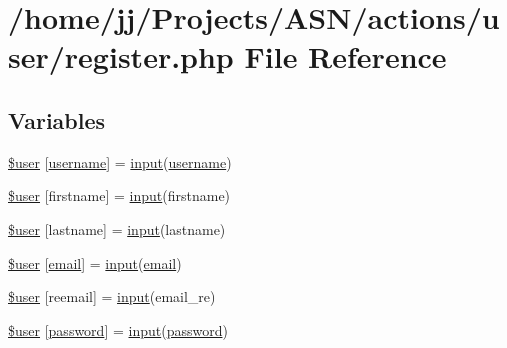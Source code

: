 \hypertarget{register_8php}{}\section{/home/jj/\+Projects/\+A\+S\+N/actions/user/register.php File Reference}
\label{register_8php}
\subsection*{Variables}
\begin{DoxyCompactItemize}
\item 
\hyperlink{register_8php_a48c184d1487bdbc0b0d2fe6e1521dd7d}{\$user} \mbox{[}\textquotesingle{}\hyperlink{actions_2account_8php_ac9b3768ccc688c2ff0811c50c107a02e}{username}\textquotesingle{}\mbox{]} = \hyperlink{ossn_8lib_8input_8php_a64ebee98b041c4f75f71ed3cd73cc8ed}{input}(\textquotesingle{}\hyperlink{actions_2account_8php_ac9b3768ccc688c2ff0811c50c107a02e}{username}\textquotesingle{})
\item 
\hyperlink{register_8php_a3c8ba9ea696968574370c51a90ff638c}{\$user} \mbox{[}\textquotesingle{}firstname\textquotesingle{}\mbox{]} = \hyperlink{ossn_8lib_8input_8php_a64ebee98b041c4f75f71ed3cd73cc8ed}{input}(\textquotesingle{}firstname\textquotesingle{})
\item 
\hyperlink{register_8php_a1187774c6d9942181216e0839e5e73bc}{\$user} \mbox{[}\textquotesingle{}lastname\textquotesingle{}\mbox{]} = \hyperlink{ossn_8lib_8input_8php_a64ebee98b041c4f75f71ed3cd73cc8ed}{input}(\textquotesingle{}lastname\textquotesingle{})
\item 
\hyperlink{register_8php_ae9de5cc5ae3fec81bb110d3a77ad7eec}{\$user} \mbox{[}\textquotesingle{}\hyperlink{actions_2account_8php_a011c66ae212438e0d7de7c0e40451bb3}{email}\textquotesingle{}\mbox{]} = \hyperlink{ossn_8lib_8input_8php_a64ebee98b041c4f75f71ed3cd73cc8ed}{input}(\textquotesingle{}\hyperlink{actions_2account_8php_a011c66ae212438e0d7de7c0e40451bb3}{email}\textquotesingle{})
\item 
\hyperlink{register_8php_a51e0459c93e600b4959a74463028a5e1}{\$user} \mbox{[}\textquotesingle{}reemail\textquotesingle{}\mbox{]} = \hyperlink{ossn_8lib_8input_8php_a64ebee98b041c4f75f71ed3cd73cc8ed}{input}(\textquotesingle{}email\+\_\+re\textquotesingle{})
\item 
\hyperlink{register_8php_a5afbe215d7a53599cd9f661abf8196e2}{\$user} \mbox{[}\textquotesingle{}\hyperlink{actions_2account_8php_a3ef39d3ee8b2bcca6a288308549ccb44}{password}\textquotesingle{}\mbox{]} = \hyperlink{ossn_8lib_8input_8php_a64ebee98b041c4f75f71ed3cd73cc8ed}{input}(\textquotesingle{}\hyperlink{actions_2account_8php_a3ef39d3ee8b2bcca6a288308549ccb44}{password}\textquotesingle{})

\end{DoxyCompactItemize}
